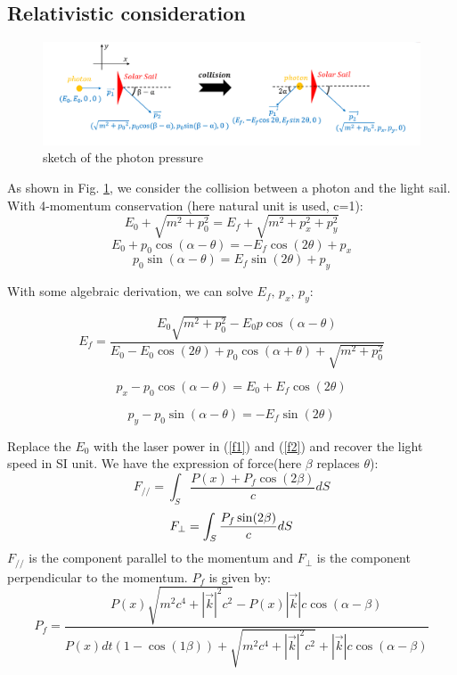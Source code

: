 \documentclass{article}
\begin{document}
\subsection{Relativistic consideration}
\begin{figure}[htpb]
	\centering
	\includegraphics[width=12cm]{dyn.png}
	\caption{sketch of the photon pressure}
	\label{dyn}
\end{figure}
As shown in Fig. \ref{dyn}, we consider the collision between a photon and the light sail. With 4-momentum conservation (here natural unit is used, c=1):
\begin{equation}
	E_0+\sqrt{m^2+p_0^2} = E_f + \sqrt{m^2+p_x^2+p_y^2}
\end{equation}
\begin{equation}
	E_0+p_0\cos(\alpha-\theta) = -E_f \cos(2\theta) +p_x
\end{equation}
\begin{equation}
	p_0 \sin (\alpha-\theta) = E_f \sin(2\theta) + p_y
\end{equation}

With some algebraic derivation, we can solve $E_f,\, p_x,\, p_y$:

\begin{equation}
	E_f= \frac{E_0\sqrt{m^2+p_0^2} - E_0 p \cos (\alpha -\theta ) }{E_0-E_0 \cos(2\theta) + p_0 \cos (\alpha+\theta) +\sqrt{m^2+p_0^2} }
\end{equation}

\begin{equation}
p_x-p_0\cos(\alpha-\theta) = E_0+ E_f \cos(2\theta)
\label{f1}
\end{equation}

\begin{equation}
	p_y-p_0\sin (\alpha-\theta) = -E_f \sin(2\theta)
	\label{f2}
\end{equation}

Replace the $E_0$ with the laser power in (\ref{f1}) and (\ref{f2}) and recover the light speed in SI unit. We have the expression of force(here $\beta$ replaces $\theta$):
\begin{equation}
F_{//}=\int_S \frac{P(x) +P_f \cos (2\beta) }{c} dS 
\end{equation}
\begin{equation}
F_{\perp}=\int_S \frac{P_f \sin (2\beta)}{c} dS \\
\end{equation}
$F_{//}$ is the component parallel to the momentum and $F_\perp$ is the component perpendicular to the momentum.
$P_f$ is given by:
\begin{equation}
P_f=\frac{P(x) \sqrt{m^2c^4+|\vec{k}|^2c^2 } - P(x)|\vec{k}|c \cos(\alpha- \beta) }{P(x)dt (1-\cos(1\beta)) +\sqrt{m^2c^4+|\vec{k}|^2c^2 } + |\vec{k}|c \cos(\alpha- \beta) }
\end{equation}
\end{document}

